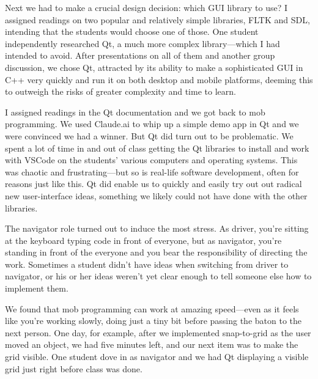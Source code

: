 \documentclass{article}
\begin{document}
Next we had to make a crucial design decision: which GUI library to use?
I assigned readings on two popular and relatively simple libraries, FLTK and
SDL, intending that the students would choose one of those. One student
independently researched Qt, a much more complex library---which I had
intended to avoid. After presentations on all of them and another group
discussion, we chose Qt, attracted by its ability to make a sophisticated
GUI in C++ very quickly and run it on both desktop and mobile platforms,
deeming this to outweigh the risks of greater complexity and time to learn.

I assigned readings in the Qt documentation and we got back to mob
programming. We used Claude.ai to whip up a simple demo app in Qt and we were
convinced we had a winner. But Qt did turn out to be problematic. We spent a
lot of time in and out of class getting the Qt libraries to install
and work with VSCode on the students' various computers and operating systems.
This was chaotic and frustrating---but so is real-life software development,
often for reasons just like this. Qt did enable us to quickly and easily try
out out radical new user-interface ideas, something we likely could not have
done with the other libraries.

The navigator role turned out to induce the most stress. As driver,
you're sitting at the keyboard typing code in front of everyone, but as
navigator, you're standing in front of the everyone and you bear the
responsibility of directing the work. Sometimes a student didn't have ideas
when switching from driver to navigator, or his or her ideas weren't yet clear
enough to tell someone else how to implement them. 

We found that mob programming can work at amazing speed---even as it feels
like you're working slowly, doing just a tiny bit before passing the baton to
the next person.  One day, for example, after we implemented snap-to-grid as
the user moved an object, we had five minutes left, and our next item was to
make the grid visible. One student dove in as navigator and we had Qt
displaying a visible grid just right before class was done.

\begin{comment}
``common knowledge''

The day I improvised a lecture on agile vs. waterfall. Previous exposure had
given some students the impression that agile is hopelessly high-risk
because it has no discipline and other
students the impression that waterfall is hopelessly high-risk because it's
inflexible and assumes perfect forethought.

Some students had previous experience with Git and some did not.

No textbooks.

Hard to teach, easy to teach.

Danger: what if a prima donna shows up?

quiet students not asking questions, not having their problems addressed---not
a problem now
\end{comment}
\end{document}
